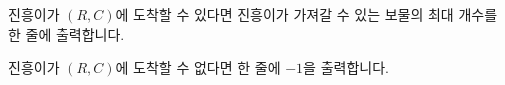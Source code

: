 진흥이가 $(R,C)$에 도착할 수 있다면 진흥이가 가져갈 수 있는 보물의 최대 개수를 한 줄에 출력합니다.

진흥이가 $(R,C)$에 도착할 수 없다면 한 줄에 $-1$을 출력합니다.